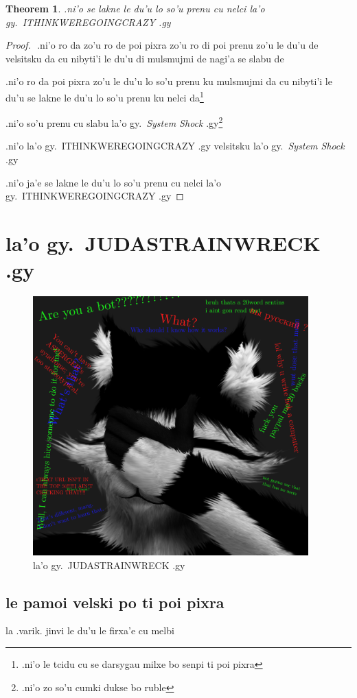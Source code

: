 \documentclass{report}
\newtheorem{thm}{Theorem}
\begin{document}
\begin{thm}
.ni'o se lakne le du'u lo so'u prenu cu nelci la'o gy.\ ITHINKWEREGOINGCRAZY .gy

\end{thm}
\begin{proof}
${}$
.ni'o ro da zo'u ro de poi pixra zo'u ro di poi prenu zo'u le du'u de velsitsku da cu nibyti'i le du'u di mulsmujmi de nagi'a se slabu de

.ni'o ro da poi pixra zo'u le du'u lo so'u prenu ku mulsmujmi da cu nibyti'i le du'u se lakne le du'u lo so'u prenu ku nelci da\footnote{.ni'o le tcidu cu se darsygau milxe bo senpi ti poi pixra}

.ni'o so'u prenu cu slabu la'o gy.\ \textit{System Shock} .gy\footnote{.ni'o zo so'u cumki dukse bo ruble}

.ni'o la'o gy.\ ITHINKWEREGOINGCRAZY .gy velsitsku la'o gy.\ \textit{System Shock} .gy

.ni'o ja'e se lakne le du'u lo so'u prenu cu nelci la'o gy.\ ITHINKWEREGOINGCRAZY .gy

\end{proof}
\chapter{la'o gy.\ JUDASTRAINWRECK .gy}
\begin{figure}[ht]
	\centering
	\includegraphics[height=10cm]{judastrainwreck/judastrainwreck.png}
	\caption[center]{la'o gy.\ JUDASTRAINWRECK .gy}
\end{figure}
\section{le pamoi velski po ti poi pixra}
la .varik. jinvi le du'u le firxa'e cu melbi
\end{document}

